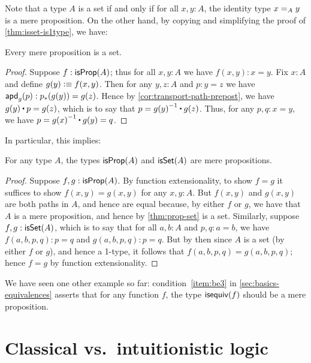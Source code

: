 Note that a type $A$ is a set if and only if for all $x,y:A$, the identity type $\id[A]xy$ is a mere proposition.
On the other hand, by copying and simplifying the proof of \autoref{thm:isset-is1type}, we have:

\begin{lem}\label{thm:prop-set}
  Every mere proposition is a set.
\end{lem}
\begin{proof}
  Suppose $f:\isprop(A)$; thus for all $x,y:A$ we have $f(x,y):x=y$.  Fix $x:A$
  and define $g(y)\defeq f(x,y)$.   Then for any $y,z:A$ and $p:y=z$ we have $\apd
  g p : \trans{p}{g(y)}={g(z)}$.  Hence by \autoref{cor:transport-path-prepost}, we have
  $g(y)\ct p = g(z)$, which is to say that $p=\opp{g(y)}\ct g(z)$.  Thus, for
  any $p,q:x=y$, we have $p = \opp{g(x)}\ct g(y) = q$.
\end{proof}

In particular, this implies:

\begin{lem}\label{thm:isprop-isprop}\label{thm:isprop-isset}
  For any type $A$, the types $\isprop(A)$ and $\isset(A)$ are mere propositions.
\end{lem}
\begin{proof}
  Suppose $f,g:\isprop(A)$.  By function extensionality, to show $f=g$ it
  suffices to show $f(x,y)=g(x,y)$ for any $x,y:A$.  But $f(x,y)$ and $g(x,y)$
  are both paths in $A$, and hence are equal because, by either $f$ or $g$, we
  have that $A$ is a mere proposition, and hence by \autoref{thm:prop-set} is a
  set.  Similarly, suppose $f,g:\isset(A)$, which is to say that for all
  $a,b:A$ and $p,q:a=b$, we have $f(a,b,p,q):p=q$ and $g(a,b,p,q):p=q$.  But by then since $A$ is a set (by
  either $f$ or $g$), and hence a 1-type, it follows that $f(a,b,p,q)=g(a,b,p,q)$; hence $f=g$ by
  function extensionality.
\end{proof}

We have seen one other example so far: condition~\ref{item:be3} in \autoref{sec:basics-equivalences} asserts that for any function $f$, the type $\isequiv (f)$ should be a mere proposition.

%
%

\section{Classical vs.\ intuitionistic logic}
\label{sec:intuitionism}

